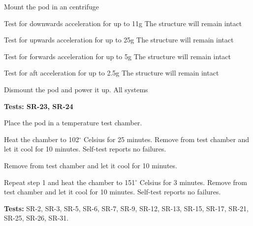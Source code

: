 \documentclass[Main]{subfiles}
\begin{document}
\begin{TestCase}
\TC
{Mount the pod in an centrifuge}
{}

\TC
{Test for downwards acceleration for up to 11g}
{The structure will remain intact}

\TC
{Test for upwards acceleration for up to 25g}
{The structure will remain intact}

\TC
{Test for forwards acceleration for up to 5g}
{The structure will remain intact}

\TC
{Test for aft acceleration for up to 2.5g}
{The structure will remain intact}

\TC
{Dismount the pod and power it up.}
{All systems}

\end{TestCase}


\newpage
\textbf{Tests: SR-23, SR-24}


\begin{TestCaseIntro}
\end{TestCaseIntro}

\begin{TestCase}
\TC
{Place the pod in a temperature test chamber.}
{}


\TC
{Heat the chamber to 102$^\circ$ Celsius for 25 minutes. 
Remove from test chamber and let it cool for 10 minutes.}
{Self-test reports no failures.}


\TC
{Remove from test chamber and let it cool for 10 minutes.}
{}

\TC
{Repeat step 1 and heat the chamber to 151$^\circ$ Celsius for 3 minutes. 
Remove from test chamber and let it cool for 10 minutes.}
{Self-test reports no failures.}


\end{TestCase}


\newpage

\textbf{Tests:} SR-2, SR-3, SR-5, SR-6, SR-7, SR-9, SR-12, SR-13, SR-15, SR-17, SR-21, SR-25, SR-26, SR-31.


\begin{TestCaseIntro}
\end{TestCaseIntro}
\end{document}
